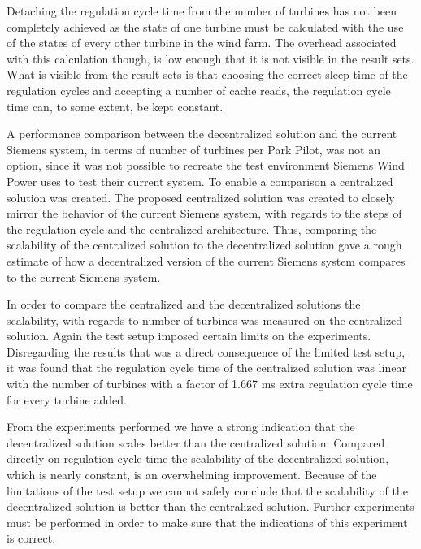 Detaching the regulation cycle time from the number of turbines has not been completely achieved as the state of one turbine must be calculated with the use of the states of every other turbine in the wind farm. The overhead associated with this calculation though, is low enough that it is not visible in the result sets. What is visible from the result sets is that choosing the correct sleep time of the regulation cycles and accepting a number of cache reads, the regulation cycle time can, to some extent, be kept constant.

A performance comparison between the decentralized solution and the current Siemens system, in terms of number of turbines per Park Pilot, was not an option, since it was not possible to recreate the test environment Siemens Wind Power uses to test their current system. To enable a comparison a centralized solution was created. The proposed centralized solution was created to closely mirror the behavior of the current Siemens system, with regards to the steps of the regulation cycle and the centralized architecture. Thus, comparing the scalability of the centralized solution to the decentralized solution gave a rough estimate of how a decentralized version of the current Siemens system compares to the current Siemens system.

In order to compare the centralized and the decentralized solutions the scalability, with regards to number of turbines was measured on the centralized solution. Again the test setup imposed certain limits on the experiments. Disregarding the results that was a direct consequence of the limited test setup, it was found that the regulation cycle time of the centralized solution was linear with the number of turbines with a factor of 1.667 ms extra regulation cycle time for every turbine added.

From the experiments performed we have a strong indication that the decentralized solution scales better than the centralized solution. Compared directly on regulation cycle time the scalability of the decentralized solution, which is nearly constant, is an overwhelming improvement. Because of the limitations of the test setup we cannot safely conclude that the scalability of the decentralized solution is better than the centralized solution. Further experiments must be performed in order to make sure that the indications of this experiment is correct.

